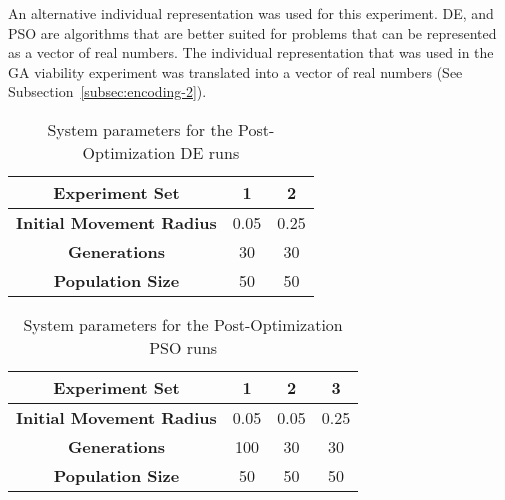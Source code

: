 An alternative individual representation was used for this experiment. DE, and PSO are algorithms that are better suited for problems that can be represented as a vector of real numbers. The individual representation that was used in the GA viability experiment was translated into a vector of real numbers (See Subsection~\ref{subsec:encoding-2}).

\begin{table}
	\centering
	\begin{tabular}{ | >{\bfseries}c | c | c | }
		\hline
		Experiment Set & 1 & 2 \\ \hline
		Initial Movement Radius & 0.05 & 0.25 \\ \hline
		Generations & 30 & 30 \\ \hline
		Population Size & 50 & 50 \\ \hline
	\end{tabular}
	\caption{System parameters for the Post-Optimization DE runs}
	\label{table:post-op-de}
\end{table}

\begin{table}
	\centering
	\begin{tabular}{ | >{\bfseries}c | c | c | c | }
		\hline
		Experiment Set & 1 & 2 & 3 \\ \hline
		Initial Movement Radius & 0.05 & 0.05 & 0.25 \\ \hline
		Generations & 100 & 30 & 30 \\ \hline
		Population Size & 50 & 50 & 50 \\ \hline
	\end{tabular}
	\caption{System parameters for the Post-Optimization PSO runs}
	\label{table:post-op-pso}
\end{table}